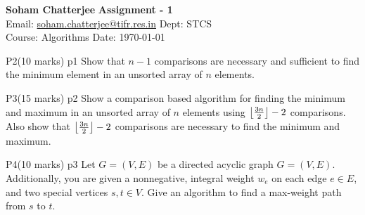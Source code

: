 \documentclass[a4paper, 11pt]{article}
\begin{document}
	
	
	\textsf{\noindent \large\textbf{Soham Chatterjee} \hfill \textbf{Assignment - 1}\\
		Email: \href{soham.chatterjee@tifr.res.in}{soham.chatterjee@tifr.res.in} \hfill Dept: STCS\\
		\normalsize Course: Algorithms \hfill Date: \today}
	
	
\begin{problem}{%
		P2\hfill  (10 marks)
	}{p1%
}
Show that $n-1$ comparisons are necessary and sufficient to find the minimum element in an unsorted array of $n$ elements.

\end{problem}
\solve{	

}

\begin{problem}{%
		P3\hfill  (15 marks)
	}{p2%
	}
Show a comparison based algorithm for finding the minimum and maximum in an unsorted array of $n$ elements using $\left\lfloor \frac{3n}2\right\rfloor-2$ comparisons. Also show that $\left\lfloor \frac{3n}2\right\rfloor-2$ comparisons are necessary to find the minimum and maximum.
\end{problem}
\solve{	

}


\begin{problem}{%
		P4\hfill  (10 marks)
	}{p3%
	}
Let $G=(V,E)$ be a directed acyclic graph $G=(V,E)$. Additionally, you are given a nonnegative, integral weight $w_e$ on each edge $e\in E$, and two special vertices $s,t\in V$. Give an algorithm to find a max-weight path from $s$ to $t$.
\end{problem}
\solve{

}
\end{document}
